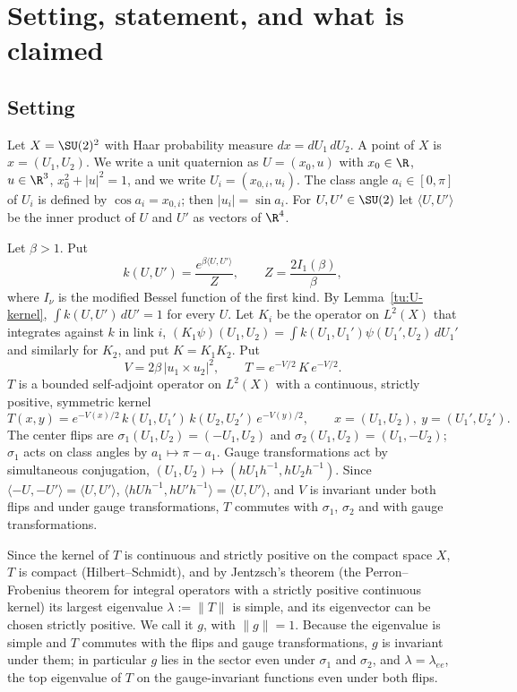 
\section{Setting, statement, and what is claimed}\label{tu:U-sec-intro}

\subsection{Setting}
Let $X=\SU(2)^2$ with Haar probability measure $dx=dU_1\,dU_2$. A point of $X$ is $x=(U_1,U_2)$.
We write a unit quaternion as $U=(x_0,u)$ with $x_0\in\R$, $u\in\R^3$, $x_0^2+|u|^2=1$, and we write
$U_i=(x_{0,i},u_i)$. The class angle $a_i\in[0,\pi]$ of $U_i$ is defined by $\cos a_i=x_{0,i}$; then
$|u_i|=\sin a_i$. For $U,U'\in\SU(2)$ let $\langle U,U'\rangle$ be the inner product of $U$ and $U'$ as
vectors of $\R^4$.

Let $\beta>1$. Put
\[
k(U,U')=\frac{e^{\beta\langle U,U'\rangle}}{Z},\qquad Z=\frac{2I_1(\beta)}{\beta},
\]
where $I_\nu$ is the modified Bessel function of the first kind. By Lemma~\ref{tu:U-kernel},
$\int k(U,U')\,dU'=1$ for every $U$. Let $K_i$ be the operator on $L^2(X)$ that integrates against $k$
in link $i$, $(K_1\psi)(U_1,U_2)=\int k(U_1,U_1')\psi(U_1',U_2)\,dU_1'$ and similarly for $K_2$, and put
$K=K_1K_2$. Put
\[
V=2\beta\,|u_1\times u_2|^2,\qquad T=e^{-V/2}\,K\,e^{-V/2}.
\]
$T$ is a bounded self-adjoint operator on $L^2(X)$ with a continuous, strictly positive, symmetric
kernel
\[
T(x,y)=e^{-V(x)/2}\,k(U_1,U_1')\,k(U_2,U_2')\,e^{-V(y)/2},\qquad x=(U_1,U_2),\ y=(U_1',U_2').
\]
The center flips are $\sigma_1(U_1,U_2)=(-U_1,U_2)$ and $\sigma_2(U_1,U_2)=(U_1,-U_2)$; $\sigma_1$ acts on
class angles by $a_1\mapsto\pi-a_1$. Gauge transformations act by simultaneous conjugation,
$(U_1,U_2)\mapsto(hU_1h^{-1},hU_2h^{-1})$. Since $\langle -U,-U'\rangle=\langle U,U'\rangle$,
$\langle hUh^{-1},hU'h^{-1}\rangle=\langle U,U'\rangle$, and $V$ is invariant under both flips and under
gauge transformations, $T$ commutes with $\sigma_1$, $\sigma_2$ and with gauge transformations.

Since the kernel of $T$ is continuous and strictly positive on the compact space $X$, $T$ is compact
(Hilbert--Schmidt), and by Jentzsch's theorem (the Perron--Frobenius theorem for integral operators with
a strictly positive continuous kernel) its largest eigenvalue $\lambda:=\|T\|$ is simple, and its eigenvector
can be chosen strictly positive. We call it $g$, with $\|g\|=1$. Because the eigenvalue is simple and $T$ commutes with
the flips and gauge transformations, $g$ is invariant under them; in particular $g$ lies in the sector
even under $\sigma_1$ and $\sigma_2$, and $\lambda=\lambda_{ee}$, the top eigenvalue of $T$ on the
gauge-invariant functions even under both flips.

